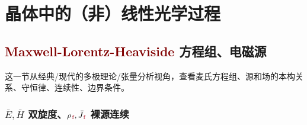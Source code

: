\chapter{晶体中的（非）线性光学过程}\label{chap:N/LCO}

\section{\textcolor{Maroon}{Maxwell-Lorentz-Heaviside} 方程组、电磁源}\label{sec:maxwell}

这一节从经典/现代的多极理论/张量分析视角，查看麦氏方程组、源和场的本构关系、守恒律、连续性、边界条件。

\subsection{$\bar{E},\bar{H}$ 双旋度、${\rho}_{\;\!\textcolor{Maroon}{\text{f}}}, \bar{J}_{\;\!\textcolor{Maroon}{\text{f}}}$ 裸源连续}\label{ssec:EHpJf}

